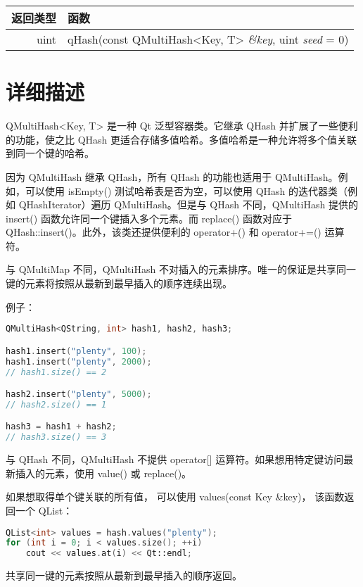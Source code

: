 \begin{longtable}{|r|l|}   
    \hline
    返回类型 	& 函数 \\
    \hline
    uint &	qHash(const QMultiHash<Key, T> \emph{\&key}, uint \emph{seed} = 0) \\ 
    \hline
\end{longtable}

\section{详细描述}

QMultiHash<Key, T> 是一种 Qt 泛型容器类。它继承 QHash 并扩展了一些便利的功能，使之比 QHash 更适合存储多值哈希。多值哈希是一种允许将多个值关联到同一个键的哈希。

因为 QMultiHash 继承 QHash，所有 QHash 的功能也适用于 QMultiHash。例如，可以使用 isEmpty() 测试哈希表是否为空，可以使用 QHash 的迭代器类（例如 QHashIterator）遍历 QMultiHash。但是与 QHash 不同，QMultiHash 提供的 insert() 函数允许同一个键插入多个元素。而 replace() 函数对应于 QHash::insert()。此外，该类还提供便利的 operator+() 和 operator+=() 运算符。

与 QMultiMap 不同，QMultiHash 不对插入的元素排序。唯一的保证是共享同一键的元素将按照从最新到最早插入的顺序连续出现。

例子：

\begin{lstlisting}[language=C++]
QMultiHash<QString, int> hash1, hash2, hash3;

hash1.insert("plenty", 100);
hash1.insert("plenty", 2000);
// hash1.size() == 2

hash2.insert("plenty", 5000);
// hash2.size() == 1

hash3 = hash1 + hash2;
// hash3.size() == 3
\end{lstlisting}


与 QHash 不同，QMultiHash 不提供 operator[] 运算符。如果想用特定键访问最新插入的元素，使用 value() 或 replace()。

如果想取得单个键关联的所有值，
可以使用 values(const Key \&key)，
该函数返回一个 QList：

\begin{lstlisting}[language=C++]
QList<int> values = hash.values("plenty");
for (int i = 0; i < values.size(); ++i)
    cout << values.at(i) << Qt::endl;
\end{lstlisting}

共享同一键的元素按照从最新到最早插入的顺序返回。

